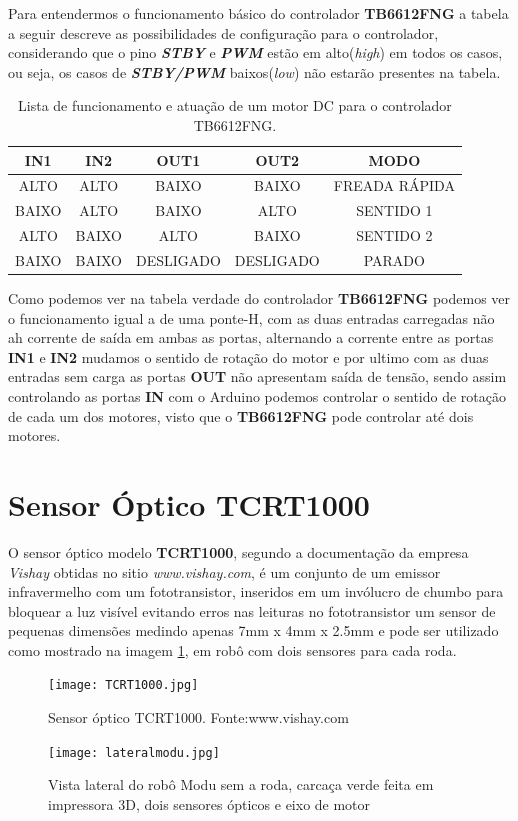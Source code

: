 \documentclass[a4paper,12pt,portuguese]{ufms-cpcx}
\begin{document}
Para entendermos o funcionamento básico do controlador \textbf{TB6612FNG} a tabela a seguir descreve as possibilidades de configuração para o controlador, considerando que o pino \textit{\textbf{STBY}} e \textit{\textbf{PWM}} estão em alto(\textit{high}) em todos os casos, ou seja, os casos de \textit{\textbf{STBY/PWM}} baixos(\textit{low}) não estarão presentes na tabela.
\begin{table}[!h]
	\renewcommand{\arraystretch}{1.3}
	\centering
	\begin{tabular}{|c|c|c|c|c|}
		\hline
		\textbf{IN1} & \textbf{IN2} & \textbf{OUT1} & \textbf{OUT2} & \textbf{MODO} \\ \hline
		    ALTO     &     ALTO     &     BAIXO     &     BAIXO     & FREADA RÁPIDA \\ \hline
		   BAIXO     &     ALTO     &     BAIXO     &     ALTO      &   SENTIDO 1   \\ \hline
		    ALTO     &    BAIXO     &     ALTO      &     BAIXO     &   SENTIDO 2   \\ \hline
		   BAIXO     &    BAIXO     &   DESLIGADO   &   DESLIGADO   &    PARADO     \\ \hline
	\end{tabular}
	\caption[Tabela verdade controle motor]{Lista de funcionamento e atuação de um motor DC para o controlador TB6612FNG.}
	\label{Tab:TB6612FNG}
\end{table}
Como podemos ver na tabela verdade do controlador \textbf{TB6612FNG} podemos ver o funcionamento igual a de uma ponte-H, com as duas entradas carregadas não ah corrente de saída em ambas as portas, alternando a corrente entre as portas \textbf{IN1} e \textbf{IN2} mudamos o sentido de rotação do motor e por ultimo com as duas entradas sem carga as portas \textbf{OUT} não apresentam saída de tensão, sendo assim controlando as portas \textbf{IN} com o Arduino podemos controlar o sentido de rotação de cada um dos motores, visto que o \textbf{TB6612FNG} pode controlar até dois motores.

\section{Sensor Óptico TCRT1000}\label{TCRT1000}
O sensor óptico modelo \textbf{TCRT1000}, segundo a documentação da empresa \textit{Vishay} obtidas no sitio \textit{www.vishay.com}, é um conjunto de um emissor infravermelho com um fototransistor, inseridos em um invólucro de chumbo para bloquear a luz visível evitando erros nas leituras no fototransistor um sensor de pequenas dimensões medindo apenas 7mm x 4mm x 2.5mm e pode ser utilizado como mostrado na imagem \ref{fig:lateralmodu}, em robô com dois sensores para cada roda.
\begin{figure}[H]
	\centering
	\texttt{[image: TCRT1000.jpg]}
	\caption{Sensor óptico TCRT1000. Fonte:www.vishay.com}
\end{figure}
\begin{figure}[H]
	\centering
	\texttt{[image: lateralmodu.jpg]}
	\caption{Vista lateral do robô Modu sem a roda, carcaça verde feita em impressora 3D, dois sensores ópticos e eixo de motor}
	\label{fig:lateralmodu}
\end{figure}
\end{document}

